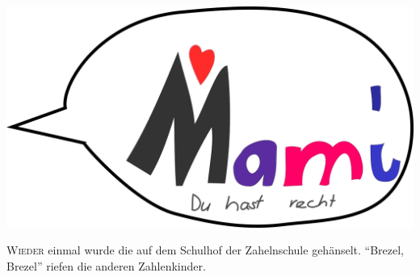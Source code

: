 ﻿\thispagestyle{empty}
\begin{center}
\includegraphics[width=\textwidth]{./bilder/fangen.png}
\end{center}
\vspace*{\fill}
{\centering\fontsize{50}{48} \color{farbe}\par}
\newpage
\lettrine[lines=3, lhang=.2, loversize=.25, lraise=0.05, findent=0.1em,
nindent=0em]{W}{ieder} einmal wurde die  auf dem Schulhof der Zahelnschule gehänselt. \enquote{Brezel, Brezel} riefen die anderen Zahlenkinder. 
